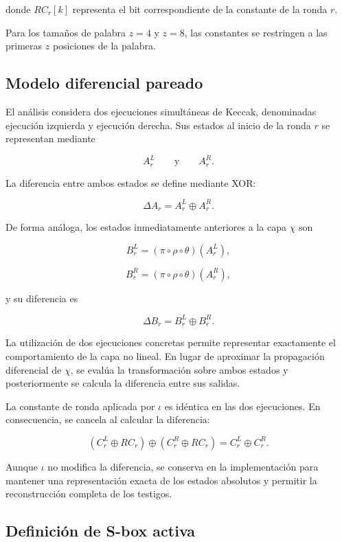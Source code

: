 donde $RC_r[k]$ representa el bit correspondiente de la constante de la
ronda $r$.

Para los tamaños de palabra $z=4$ y $z=8$, las constantes se restringen a
las primeras $z$ posiciones de la palabra.


\subsection{Modelo diferencial pareado}
\label{subsec:modelo_diferencial_pareado}

El análisis considera dos ejecuciones simultáneas de Keccak, denominadas
ejecución izquierda y ejecución derecha. Sus estados al inicio de la ronda
$r$ se representan mediante

\[
A_r^L
\qquad \text{y} \qquad
A_r^R.
\]

La diferencia entre ambos estados se define mediante XOR:

\[
\Delta A_r
=
A_r^L \oplus A_r^R.
\]

De forma análoga, los estados inmediatamente anteriores a la capa $\chi$
son

\[
B_r^L
=
(\pi \circ \rho \circ \theta)(A_r^L),
\]

\[
B_r^R
=
(\pi \circ \rho \circ \theta)(A_r^R),
\]

y su diferencia es

\[
\Delta B_r
=
B_r^L \oplus B_r^R.
\]

La utilización de dos ejecuciones concretas permite representar
exactamente el comportamiento de la capa no lineal. En lugar de aproximar
la propagación diferencial de $\chi$, se evalúa la transformación sobre
ambos estados y posteriormente se calcula la diferencia entre sus salidas.

La constante de ronda aplicada por $\iota$ es idéntica en las dos
ejecuciones. En consecuencia, se cancela al calcular la diferencia:

\[
\left(
C_r^L \oplus RC_r
\right)
\oplus
\left(
C_r^R \oplus RC_r
\right)
=
C_r^L \oplus C_r^R.
\]

Aunque $\iota$ no modifica la diferencia, se conserva en la implementación
para mantener una representación exacta de los estados absolutos y permitir
la reconstrucción completa de los testigos.


\subsection{Definición de S-box activa}
\label{subsec:sbox_activa}

